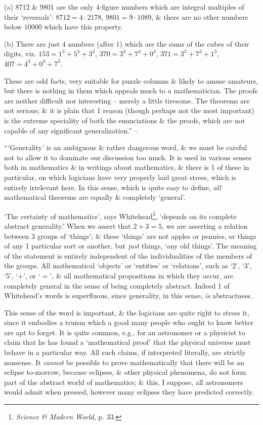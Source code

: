 \documentclass{article}
\numberwithin{equation}{section}
\begin{document}
(a) 8712 \& 9801 are the only 4-figure numbers which are integral multiples of their `reversals': $8712 = 4\cdot2178$, $9801 = 9\cdot1089$, \& there are no other numbers below $10000$ which have this property.

(b) There are just 4 numbers (after 1) which are the sums of the cubes of their digits, viz. $153 = 1^3 + 5^3 + 3^3$, $370 = 3^3 + 7^3 + 0^3$, $371 = 3^3 + 7^3 + 1^3$, $407 = 4^3 + 0^3 + 7^3$.

These are odd facts, very suitable for puzzle columns \& likely to amuse amateurs, but there is nothing in them which appeals much to a mathematician. The proofs are neither difficult nor interesting -- merely a little tiresome. The theorems are not serious; \& it is plain that 1 reason (though perhaps not the most important) is the extreme speciality of both the enunciations \& the proofs, which are not capable of any significant generalization.'' -- \cite[pp. 103--105]{Hardy1992}

 ```Generality' is an ambiguous \& rather dangerous word, \& we must be careful not to allow it to dominate our discussion too much. It is used in various senses both in mathematics \& in writings about mathematics, \& there is 1 of these in particular, on which logicians have very properly laid great stress, which is entirely irrelevant here. In this sense, which is quite easy to define, \textit{all} mathematical theorems are equally \& completely `general'.

`The certainty of mathematics', says Whitehead\footnote{\textit{Science \& Modern World}, p. 33.}, `depends on its complete abstract generality.' When we assert that $2 + 3 = 5$, we are asserting a relation between 3 groups of `things'; \& these `things' are not apples or pennies, or things of any 1 particular sort or another, but \textit{just} things, `any old things'. The meaning of the statement is entirely independent of the individualities of the members of the groups. All mathematical `objects' or `entities' or `relations', such as `2', `3', `5', `$+$', or `$=$', \& all mathematical propositions in which they occur, are completely general in the sense of being completely abstract. Indeed 1 of Whitehead's words is superfluous, since generality, in this sense, \textit{is} abstractness.

This sense of the word is important, \& the logicians are quite right to stress it, since it embodies a truism which a good many people who ought to know better are apt to forget. It is quite common, e.g., for an astronomer or a physicist to claim that he has found a `mathematical proof' that the physical universe must behave in a particular way. All such claims, if interpreted literally, are strictly nonsense. It \textit{cannot} be possible to prove mathematically that there will be an eclipse to-morrow, because eclipses, \& other physical phenomena, do not form part of the abstract world of mathematics; \&  this, I suppose, all astronomers would admit when pressed, however many eclipses they have predicted correctly.
\end{document}
